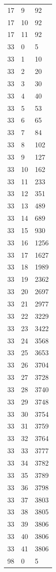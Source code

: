 \begin{table}
\begin{tabular}{|l|l|l|}
17 & 9 & 92 \\
17 & 10 & 92 \\
17 & 11 & 92 \\
\hline
33 & 0 & 5 \\
33 & 1 & 10 \\
33 & 2 & 20 \\
33 & 3 & 30 \\
33 & 4 & 40 \\
33 & 5 & 53 \\
33 & 6 & 65 \\
33 & 7 & 84 \\
33 & 8 & 102 \\
33 & 9 & 127 \\
33 & 10 & 162 \\
33 & 11 & 233 \\
33 & 12 & 351 \\
33 & 13 & 489 \\
33 & 14 & 689 \\
33 & 15 & 930 \\
33 & 16 & 1256 \\
33 & 17 & 1627 \\
33 & 18 & 1989 \\
33 & 19 & 2362 \\
33 & 20 & 2697 \\
33 & 21 & 2977 \\
33 & 22 & 3229 \\
33 & 23 & 3422 \\
33 & 24 & 3568 \\
33 & 25 & 3653 \\
33 & 26 & 3704 \\
33 & 27 & 3728 \\
33 & 28 & 3740 \\
33 & 29 & 3748 \\
33 & 30 & 3754 \\
33 & 31 & 3759 \\
33 & 32 & 3764 \\
33 & 33 & 3777 \\
33 & 34 & 3782 \\
33 & 35 & 3789 \\
33 & 36 & 3798 \\
33 & 37 & 3803 \\
33 & 38 & 3805 \\
33 & 39 & 3806 \\
33 & 40 & 3806 \\
33 & 41 & 3806 \\
\hline
98 & 0 & 5 \\

\end{tabular}
\end{table}
